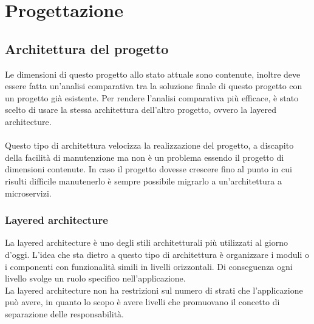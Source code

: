 
\chapter{Progettazione}
\label{cap:progettazione}


\section{Architettura del progetto}
Le dimensioni di questo progetto allo stato attuale sono contenute, inoltre deve essere fatta un'analisi
comparativa tra la soluzione finale di questo progetto con un progetto già esistente. Per rendere 
l'analisi comparativa più efficace, è stato scelto di usare la stessa architettura dell'altro progetto, 
ovvero la layered architecture.
\\\\
Questo tipo di architettura velocizza la realizzazione del progetto, a discapito della facilità di
manutenzione ma non è un problema essendo il progetto di dimensioni contenute. In caso
il progetto dovesse crescere fino al punto in cui risulti difficile manutenerlo è sempre possibile
migrarlo a un'architettura a microservizi.


\subsection{Layered architecture}
La layered architecture è uno degli stili architetturali più utilizzati al giorno d'oggi. L'idea che sta dietro a
questo tipo di architettura è organizzare i moduli o i componenti con funzionalità simili
in livelli orizzontali. Di conseguenza ogni livello svolge un ruolo specifico nell'applicazione.
\\
La layered architecture non ha restrizioni sul numero di strati che l'applicazione può avere, in quanto 
lo scopo è avere livelli che promuovano il concetto di separazione delle responsabilità.

